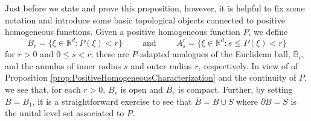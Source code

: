 \documentclass[11pt, letter]{book}
\begin{document}
Just before we state and prove this proposition, however, it is helpful to fix some notation and introduce some basic topological objects connected to positive homogeneous functions.  Given a positive homogeneous function $P$, we define
\begin{equation*}
B_r=\{\xi\in\mathbb{R}^d:P(\xi)<r\}\hspace{1cm}\mbox{and}\hspace{1cm}A_s^r=\{\xi\in\mathbb{R}^d:s\leq P(\xi)<r\}
\end{equation*}
for $r>0$ and $0\leq s<r$; these are $P$-adapted analogues of the Euclidean ball, $\mathbb{B}_r$, and the annulus of inner radius $s$ and outer radius $r$, respectively. In view of of Proposition \ref{prop:PositiveHomogeneousCharacterization} and the continuity of $P$, we see that, for each $r>0$, $B_r$ is open and $\overline{B_r}$ is compact. Further, by setting $B=B_1$, it is a straightforward exercise to see that $\overline{B}=B\cup S$ where $\partial B=S$ is the unital level set associated to $P$. 
\end{document}
